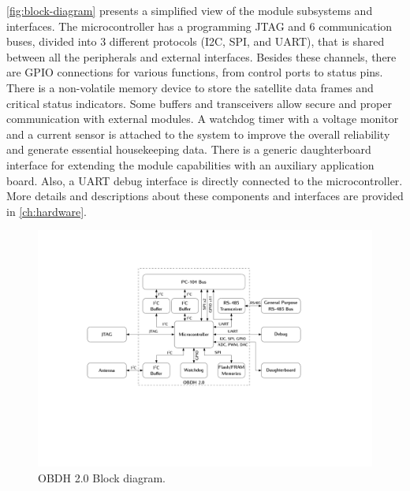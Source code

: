 \autoref{fig:block-diagram} presents a simplified view of the module subsystems and interfaces. The microcontroller has a programming JTAG
 and 6 communication buses, divided into 3 different protocols (I2C, SPI, and UART), that is shared between all the peripherals and external interfaces. Besides these channels, there are GPIO connections for various functions, from control ports to status pins. There is a non-volatile memory device to store the satellite data frames and critical status indicators. Some buffers and transceivers allow secure and proper communication with external modules. A watchdog timer with a voltage monitor and a current sensor is attached to the system to improve the overall reliability and generate essential housekeeping data. There is a generic daughterboard interface for extending the module capabilities with an auxiliary application board. Also, a UART debug interface is directly connected to the microcontroller. More details and descriptions about these components and interfaces are provided in \autoref{ch:hardware}.

\begin{figure}[!ht]
    \begin{center}
        \includegraphics[width=\textwidth]{figures/block_diagram.pdf}
        \caption{OBDH 2.0 Block diagram.}
        \label{fig:block-diagram}
    \end{center}
\end{figure}

